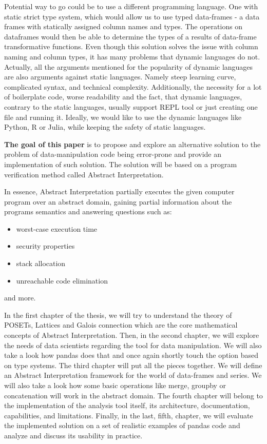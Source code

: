 Potential way to go could be to use a different programming language.
One with static strict type system, which would allow us to use typed data-frames - a data frames with statically assigned
column names and types.
The operations on dataframes would then be able to determine the types of a results of data-frame transformative functions.
Even though this solution solves the issue with column naming and column types, it has many problems that dynamic
languages do not.
Actually, all the arguments mentioned for the popularity of dynamic languages are also arguments against static languages.
Namely steep learning curve, complicated syntax, and technical complexity.
Additionally, the necessity for a lot of boilerplate code, worse readability and the fact, that dynamic languages,
contrary to the static languages, usually support REPL tool or just creating one file and running it.
Ideally, we would like to use the dynamic languages like Python, R or Julia, while keeping the safety of static languages.

\textbf{The goal of this paper} is to propose and explore an alternative solution to the problem of data-manipulation
code being error-prone and provide an implementation of such solution.
The solution will be based on a program verification method called Abstract Interpretation.


In essence, Abstract Interpretation partially executes the given computer program over an abstract domain, gaining
partial information about the programs semantics and answering questions such as: %
\begin{itemize}
    \item worst-case execution time
    \item security properties
    \item stack allocation
    \item unreachable code elimination
\end{itemize}
and more.

In the first chapter of the thesis, we will try to understand the theory of POSETs, Lattices and Galois connection which
are the core mathematical concepts of Abstract Interpretation.
Then, in the second chapter, we will explore the needs of data scientists regarding the tool for data manipulation.
We will also take a look how pandas does that and once again shortly touch the option based on type systems.
The third chapter will put all the pieces together.
We will define an Abstract Interpretation framework for the world of data-frames and series.
We will also take a look how some basic operations like merge, groupby or concatenation will work in the abstract domain.
The fourth chapter will belong to the implementation of the analysis tool itself, its architecture, documentation,
capabilities, and limitations.
Finally, in the last, fifth, chapter, we will evaluate the implemented solution on a set of realistic examples of pandas
code and analyze and discuss its usability in practice.